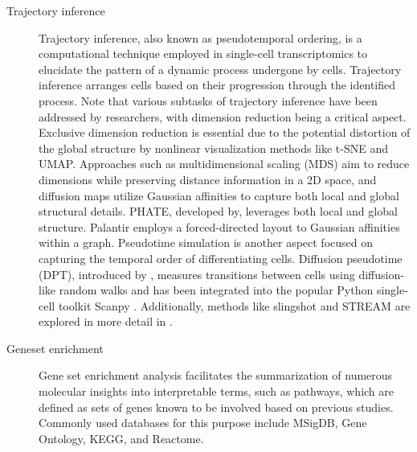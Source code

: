 \begin{description}
	\item[Trajectory inference] 
	Trajectory inference, also known as pseudotemporal ordering, is a computational technique employed in single-cell transcriptomics to elucidate the pattern of a dynamic process undergone by cells. Trajectory inference arranges cells based on their progression through the identified process. Note that various subtasks of trajectory inference have been addressed by researchers, with dimension reduction being a critical aspect. Exclusive dimension reduction is essential due to the potential distortion of the global structure by nonlinear visualization methods like t-SNE and UMAP. Approaches such as multidimensional scaling (MDS) aim to reduce dimensions while preserving distance information in a 2D space, and diffusion maps utilize Gaussian affinities to capture both local and global structural details. PHATE, developed by\citep{moon2017phate}, leverages both local and global structure. Palantir employs a forced-directed layout to Gaussian affinities within a graph. Pseudotime simulation is another aspect focused on capturing the temporal order of differentiating cells. Diffusion pseudotime (DPT), introduced by \citep{haghverdi2016dpt}, measures transitions between cells using diffusion-like random walks and has been integrated into the popular Python single-cell toolkit Scanpy \citep{wolf2018scanpy}. Additionally, methods like slingshot\citep{street2018slingshot} and STREAM\citep{chen2019stream} are explored in more detail in .

	\item[Geneset enrichment] 
	Gene set enrichment analysis facilitates the summarization of numerous molecular insights into interpretable terms, such as pathways, which are defined as sets of genes known to be involved based on previous studies. Commonly used databases for this purpose include MSigDB, Gene Ontology, KEGG, and Reactome. 
\end{description}

